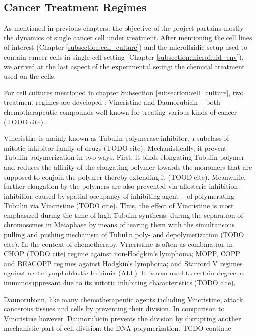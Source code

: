 \documentclass[pdftex,12pt,a4paper]{report}
\begin{document}
\subsection{Cancer Treatment Regimes}
\label{subsection:treatment}

As mentioned in previous chapters, the objective of the project partains mostly the dynamics of single cancer cell under treatment. After mentioning the cell lines of interest (Chapter \ref{subsection:cell_culture}) and the microfluidic setup used to contain cancer cells in single-cell setting (Chapter \ref{subsection:microfluid_env}), we arrived at the last aspect of the experimental seting: the chemical treatment used on the cells.

For cell cultures mentioned in chapter Subsection \ref{subsection:cell_culture}, two treatment regimes are developed : Vincristine and Daunorubicin -- both chemotherapeutic compounds well known for treating various kinds of cancer (TODO cite).

Vincristine is mainly known as Tubulin polymerase inhibitor, a subclass of mitotic inhibitor family of drugs (TODO cite). Mechanistically, it prevent Tubulin polymerization in two ways. First, it binds elongating Tubulin polymer and reduces the affinity of the elongating polymer towards the monomers that are supposed to conjoin the polymer thereby extending it (TOOD cite). Meanwhile, further elongation by the polymers are also prevented via allosteric inhibition -- inhibition caused by spatial occupancy of inhibiting agent -- of polymerating Tubulin via Vincristine (TODO cite). Thus, the effect of Vincristine is most emphasized during the time of high Tubulin synthesis: during the separation of chromosomes in Metaphase by means of tearing them with the simultaneous pulling and pushing mechanism of Tubulin poly- and depolymerization (TODO cite). In the context of chemotherapy, Vincristine is often as combination in CHOP (TODO cite) regime against non-Hodgkin's lymphoma; MOPP, COPP and BEACOPP regimes against Hodgkin's lymphoma; and Stanford V regimes against acute lymphoblastic leukimia (ALL). It is also used to certain degree as immunosuppresant due to its mitotic inhibiting characteristics (TODO cite).

Daunorubicin, like many chemotherapeutic agents including Vincristine, attack cancerous tissues and cells by preventing their division. In comparison to Vincristine however, Daunorubicin prevents the division by disrupting another mechanistic part of cell division: the DNA polymerization. TODO continue 
\end{document}
